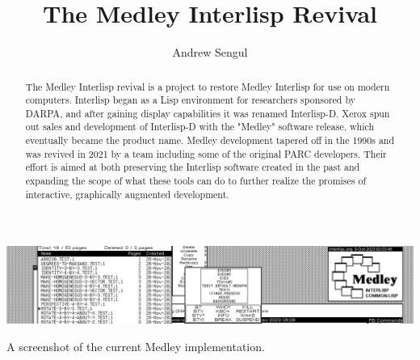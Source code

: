 \documentclass[sigconf]{acmart}
\begin{document}
\title{The Medley Interlisp Revival}


\author{Andrew Sengul}


\begin{abstract}
  The Medley Interlisp revival is a project to restore Medley Interlisp for use on modern computers. Interlisp began as a Lisp environment for researchers sponsored by DARPA, and after gaining display capabilities it was renamed Interlisp-D. Xerox spun out sales and development of Interlisp-D with the "Medley" software release, which eventually became the product name. Medley development tapered off in the 1990s and was revived in 2021 by a team including some of the original PARC developers. Their effort is aimed at both preserving the Interlisp software created in the past and expanding the scope of what these tools can do to further realize the promises of interactive, graphically augmented development.
\end{abstract}

\begin{CCSXML}
\end{CCSXML}

\begin{teaserfigure}
  \includegraphics[width=\textwidth]{MedleyShot02t}
  \caption{A screenshot of the current Medley implementation.}
  \label{fig:teaser}
\end{teaserfigure}
\end{document}
